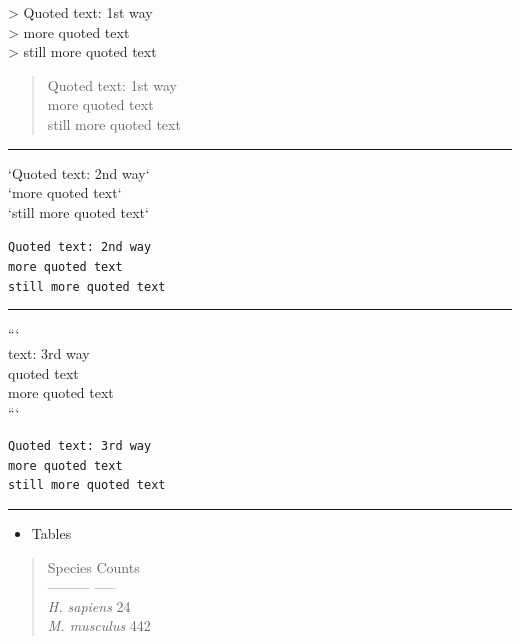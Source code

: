 \documentclass[]{article}
\providecommand{\tightlist}{%
  \setlength{\itemsep}{0pt}\setlength{\parskip}{0pt}}
\begin{document}
\textgreater{} Quoted text: 1st way\\
\textgreater{} more quoted text\\
\textgreater{} still more quoted text

\begin{quote}
Quoted text: 1st way\\
more quoted text\\
still more quoted text
\end{quote}

\begin{center}\rule{0.5\linewidth}{\linethickness}\end{center}

`Quoted text: 2nd way`\\
`more quoted text`\\
`still more quoted text`

\texttt{Quoted\ text:\ 2nd\ way}\\
\texttt{more\ quoted\ text}~\\
\texttt{still\ more\ quoted\ text}

\begin{center}\rule{0.5\linewidth}{\linethickness}\end{center}

```\\
\Quoted text: 3rd way\\
\more quoted text\\
\still more quoted text\\
```

\begin{verbatim}
Quoted text: 3rd way    
more quoted text         
still more quoted text        
\end{verbatim}

\begin{center}\rule{0.5\linewidth}{\linethickness}\end{center}

\begin{itemize}
\tightlist
\item
  Tables
\end{itemize}

\begin{quote}
Species \textbar{} Counts\\
--------- \textbar{} -----\\
\emph{H. sapiens} \textbar{} 24\\
\emph{M. musculus} \textbar{} 442
\end{quote}
\end{document}
